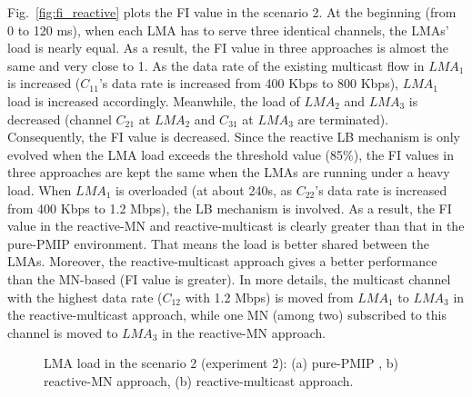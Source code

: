 Fig.~\ref{fig:fi_reactive} plots the FI value in the scenario 2. At the beginning (from 0 to 120 ms), when each LMA has to serve three identical channels, the LMAs' load is nearly equal. As a result, the FI value in three approaches is almost the same and very close to 1. 
As the data rate of the existing multicast flow in $LMA_{1}$ is increased ($C_{11}$'s data rate is increased from 400 Kbps to 800 Kbps), $LMA_{1}$ load is increased accordingly. Meanwhile, the load of $LMA_{2}$ and $LMA_{3}$ is decreased (channel $C_{21}$ at $LMA_{2}$ and $C_{31}$ at $LMA_{3}$ are terminated). Consequently, the FI value is decreased. Since the reactive LB mechanism is only evolved when the LMA load exceeds the threshold value (85\%), the FI values in three approaches are kept the same when the LMAs are running under a heavy load. When $LMA_{1}$ is overloaded (at about 240s, as $C_{22}$'s data rate is increased from 400 Kbps to 1.2 Mbps), the LB mechanism is involved. As a result, the FI value in the reactive-MN and reactive-multicast is clearly greater than that in the pure-PMIP environment. That means the load is better shared between the LMAs. Moreover, the reactive-multicast approach gives a better performance than the MN-based (FI value is greater). In more details, the multicast channel with the highest data rate ($C_{12}$ with 1.2 Mbps) is moved from $LMA_{1}$ to $LMA_{3}$ in the reactive-multicast approach, while one MN (among two) subscribed to this channel is moved to $LMA_{3}$ in the reactive-MN approach. 
\begin{figure}[h!]
\centering
{}
\caption[LMA load in the experimentation.]{LMA load in the scenario 2 (experiment 2): (a) pure-PMIP , b) reactive-MN approach, (b) reactive-multicast approach.}
\label{fig:scenario2}
\end{figure}

